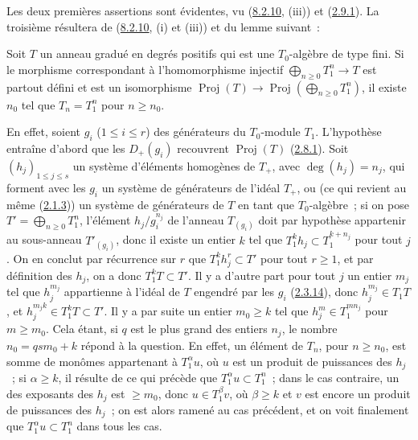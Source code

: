 Les deux premières assertions sont évidentes, vu
(\hyperref[II.8.2.10-fr]{8.2.10}, (iii)) et
(\hyperref[II.2.9.1-fr]{2.9.1}). La troisième résultera de
(\hyperref[II.8.2.10-fr]{8.2.10}, (i) et (iii)) et du lemme suivant~:

\begin{lemma}[8.2.14.1]
\label{II.8.2.14.1-fr}
Soit $T$ un anneau gradué en degrés positifs qui est une $T_0$-algèbre de type
fini. Si le morphisme correspondant à l'homomorphisme injectif
$\bigoplus_{n\geq0}T_1^n\to T$ est partout défini et est un isomorphisme
$\operatorname{Proj}(T)\to\operatorname{Proj}\left(\bigoplus_{n\geq0}T_1^n\right)$,
il existe $n_0$ tel que $T_n=T_1^n$ pour $n\geq n_0$.
\end{lemma}

En effet, soient $g_i$ ($1\leq i\leq r$) des générateurs du $T_0$-module
$T_1$. L'hypothèse entraîne d'abord que les $D_+(g_i)$ recouvrent
$\operatorname{Proj}(T)$ (\hyperref[II.2.8.1-fr]{2.8.1}). Soit
$(h_j)_{1\leq j\leq s}$ un système d'éléments homogènes de $T_+$, avec
$\deg(h_j)=n_j$, qui forment avec les $g_i$ un système de générateurs de
l'idéal $T_+$, ou (ce qui revient au même
(\hyperref[II.2.1.3-fr]{2.1.3})) un système de générateurs de $T$ en tant que
$T_0$-algèbre~; si on pose $T'=\bigoplus_{n\geq0}T_1^n$, l'élément
$h_j/g_i^{n_j}$ de l'anneau $T_{(g_i)}$ doit par hypothèse appartenir au
sous-anneau $T'_{(g_i)}$, donc il existe un entier $k$ tel que
$T_1^k h_j\subset T_1^{k+n_j}$ pour tout $j$. On en conclut par récurrence
sur $r$ que $T_1^k h_j^r\subset T'$ pour tout $r\geq1$, et par définition des
$h_j$, on a donc $T_1^kT\subset T'$. Il y a d'autre part pour tout $j$ un
entier $m_j$ tel que $h_j^{m_j}$ appartienne à l'idéal de $T$ engendré par
les $g_i$ (\hyperref[II.2.3.14-fr]{2.3.14}), donc $h_j^{m_j}\in T_1T$, et
$h_j^{m_jk}\in T_1^kT\subset T'$. Il y a par suite un entier $m_0\geq k$ tel
que $h_j^m\in T_1^{mn_j}$ pour $m\geq m_0$. Cela étant, si $q$ est le plus
grand des entiers $n_j$, le nombre $n_0=qsm_0+k$ répond à la question. En
effet, un élément de $T_n$, pour $n\geq n_0$, est somme de monômes appartenant
à $T_1^\alpha u$, où $u$ est un produit de puissances des $h_j$~; si
$\alpha\geq k$, il résulte de ce qui précède que $T_1^\alpha u\subset T_1^n$~;
dans le cas contraire, un des exposants des $h_j$ est $\geq m_0$, donc
$u\in T_1^\beta v$, où $\beta\geq k$ et $v$ est encore un produit de
puissances des $h_j$~; on est alors ramené au cas précédent, et on voit
finalement que $T_1^\alpha u\subset T_1^n$ dans tous les cas.


